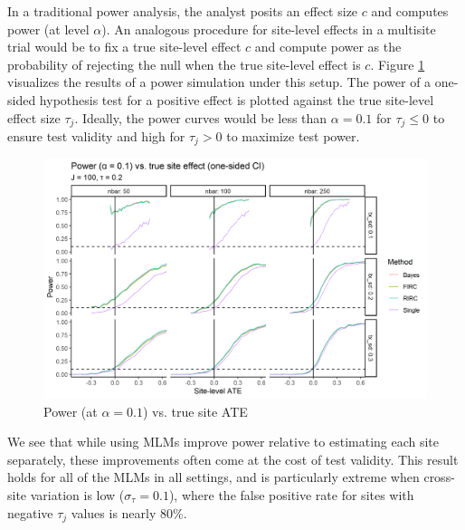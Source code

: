 \documentclass[]{article}
\begin{document}



In a traditional power analysis, the analyst posits an effect size $c$ and computes power (at level $\alpha$).
An analogous procedure for site-level effects in a multisite trial would be to fix a true site-level effect $c$ and compute power as the probability of rejecting the null when the true site-level effect is $c$.
Figure \ref{fig:power_plot} visualizes the results of a power simulation under this setup.
The power of a one-sided hypothesis test for a positive effect is plotted against the true site-level effect size $\tau_j$.
Ideally, the power curves would be less than $\alpha = 0.1$ for $\tau_j \leq 0$ to ensure test validity and high for $\tau_j > 0$ to maximize test power.
\begin{figure}[ht]
	\centering
	\includegraphics[width=\textwidth]{power_plot_J100}
	\caption{Power (at $\alpha = 0.1$) vs. true site ATE}
	\label{fig:power_plot}
\end{figure}

We see that while using MLMs improve power relative to estimating each site separately, these improvements often come at the cost of test validity.
This result holds for all of the MLMs in all settings, and is particularly extreme when cross-site variation is low ($\sigma_\tau = 0.1$), where the false positive rate for sites with negative $\tau_j$ values is nearly 80\%.
\end{document}
